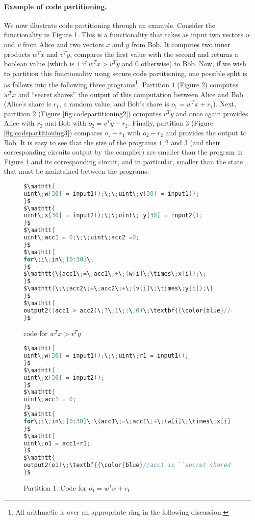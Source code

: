 \paragraph{Example of code partitioning.} We now illustrate code partitioning through an example. Consider the functionality in Figure \ref{fig:largecode}. This is a functionality that takes as input two vectors $w$ and $v$ from Alice and two vectors $x$ and $y$ from Bob. It computes two inner products $w^Tx$ and $v^Ty$, compares the first value with the second and returns a boolean value (which is $1$ if $w^Tx>v^Ty$ and $0$ otherwise) to Bob. Now, if we wish to partition this functionality using secure code partitioning, one possible split is as follows into the following three programs\footnote{All arithmetic is over an appropriate ring in the following discussion.}. Partition $1$ (Figure \ref{fig:codepartitioning1}) computes $w^Tx$ and ``secret shares'' the output of this computation between Alice and Bob (Alice's share is $r_1$, a random value, and Bob's share is $o_1 = w^Tx+r_1$). Next, partition $2$ (Figure \ref{fig:codepartitioning2}) computes $v^Ty$ and once again provides Alice with $r_2$ and Bob with $o_2 = v^Ty+r_2$. Finally, partition $3$ (Figure \ref{fig:codepartitioning3}) compares $o_1-r_1$ with $o_2-r_2$ and provides the output to Bob. It is easy to see that the size of the programs $1, 2$ and $3$ (and their corresponding circuits output by the \tool compiler) are smaller than the program in Figure \ref{fig:largecode} and its corresponding circuit, and in particular, smaller than the state that must be maintained between the programs.

\begin{figure}
\begin{lstlisting}[language=C,mathescape=true]
$\mathtt{
uint\;w[30] = input1();\;\;uint\;v[30] = input1();
}$
$\mathtt{
uint\;x[30] = input2();\;\;uint\; y[30] = input2();
}$
$\mathtt{
uint\;acc1 = 0;\;\;uint\;acc2 =0;
}$
$\mathtt{
for\;i\;in\;[0:30]\;
}$
$\mathtt{\{acc1\;=\;acc1\;+\;(w[i]\;\times\;x[i]);\;
}$
$\mathtt{\;\;acc2\;=\;acc2\;+\;(v[i]\;\times\;y[i]);\}
}$
$\mathtt{
output2((acc1 > acc2)\;?\;1\;:\;0)\;\textbf{{\color{blue}//only to party 2}}
}$
\end{lstlisting}
\caption{\tool code for $w^Tx > v^Ty$}
\label{fig:largecode}
\end{figure}

\begin{figure}
\begin{lstlisting}[language=C,mathescape=true]
$\mathtt{
uint\;w[30] = input1();\;\;uint\;r1 = input1();
}$
$\mathtt{
uint\;x[30] = input2();
}$
$\mathtt{
uint\;acc1 = 0;
}$
$\mathtt{
for\;i\;in\;[0:30]\;\{acc1\;=\;acc1\;+\;(w[i]\;\times\;x[i]);\}
}$
$\mathtt{
uint\;o1 = acc1+r1;
}$
$\mathtt{
output2(o1)\;\textbf{{\color{blue}//acc1 is ``secret shared''}}
}$
\end{lstlisting}
\caption{Partition 1: Code for $o_1 = w^Tx+r_1$}
\label{fig:codepartitioning1}
\end{figure}

